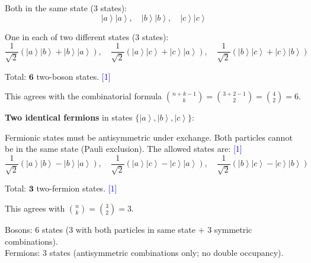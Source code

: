 \documentclass[12pt,a4paper]{article}
\newcommand{\markstep}[1]{\hfill\textcolor{blue}{[#1]}}
\newcommand{\finalanswer}[1]{%
  \begin{tcolorbox}[colback=green!5!white,colframe=green!50!black,boxrule=0.5pt]
  #1
  \end{tcolorbox}
}
\renewcommand{\ket}[1]{\left|#1\right\rangle}
\begin{document}
\begin{parts}
Both in the same state (3 states):
\[
\ket{a}\ket{a}, \quad \ket{b}\ket{b}, \quad \ket{c}\ket{c}
\]

One in each of two different states (3 states):
\[
\frac{1}{\sqrt{2}}\left(\ket{a}\ket{b} + \ket{b}\ket{a}\right), \quad \frac{1}{\sqrt{2}}\left(\ket{a}\ket{c} + \ket{c}\ket{a}\right), \quad \frac{1}{\sqrt{2}}\left(\ket{b}\ket{c} + \ket{c}\ket{b}\right)
\]

Total: $\mathbf{6}$ two-boson states. \markstep{1}

This agrees with the combinatorial formula $\binom{n+k-1}{k} = \binom{3+2-1}{2} = \binom{4}{2} = 6$.

\textbf{Two identical fermions} in states $\{\ket{a},\ket{b},\ket{c}\}$:

Fermionic states must be antisymmetric under exchange. Both particles cannot be in the same state (Pauli exclusion). The allowed states are: \markstep{1}
\[
\frac{1}{\sqrt{2}}\left(\ket{a}\ket{b} - \ket{b}\ket{a}\right), \quad \frac{1}{\sqrt{2}}\left(\ket{a}\ket{c} - \ket{c}\ket{a}\right), \quad \frac{1}{\sqrt{2}}\left(\ket{b}\ket{c} - \ket{c}\ket{b}\right)
\]

Total: $\mathbf{3}$ two-fermion states. \markstep{1}

This agrees with $\binom{n}{k} = \binom{3}{2} = 3$.

\finalanswer{Bosons: 6 states (3 with both particles in same state $+$ 3 symmetric combinations).\\
Fermions: 3 states (antisymmetric combinations only; no double occupancy).}
\end{parts}
\end{document}

